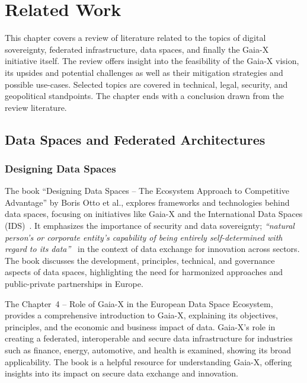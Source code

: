 \chapter{Related Work}\label{ch:related-work}

\begin{chapterabstract}
    This chapter covers a review of literature related to the topics of digital sovereignty, federated infrastructure, data spaces, and finally the Gaia-X initiative itself.
    The review offers insight into the feasibility of the Gaia-X vision, its upsides and potential challenges as well as their mitigation strategies and possible use-cases.
    Selected topics are covered in technical, legal, security, and geopolitical standpoints.
    The chapter ends with a conclusion drawn from the review literature.
\end{chapterabstract}

\section{Data Spaces and Federated Architectures}\label{sec:data-spaces-and-federated-architectures}
\subsection{Designing Data Spaces}\label{subsec:designing-data-spaces}

The book ``Designing Data Spaces -- The Ecosystem Approach to Competitive Advantage'' by Boris Otto et al., explores frameworks and technologies behind data spaces, focusing on initiatives like Gaia-X and the International Data Spaces (IDS)~\cite{designing_dataspaces}.
It emphasizes the importance of security and data sovereignty; \textit{``natural person’s or corporate entity’s capability of being entirely self-determined with regard to its data''}~\cite{designing_dataspaces} in the context of data exchange for innovation across sectors.
The book discusses the development, principles, technical, and governance aspects of data spaces, highlighting the need for harmonized approaches and public-private partnerships in Europe.

The Chapter~4 -- Role of Gaia-X in the European Data Space Ecosystem, provides a comprehensive introduction to Gaia-X, explaining its objectives, principles, and the economic and business impact of data.
Gaia-X's role in creating a federated, interoperable and secure data infrastructure for industries such as finance, energy, automotive, and health is examined, showing its broad applicability.
The book is a helpful resource for understanding Gaia-X, offering insights into its impact on secure data exchange and innovation.

